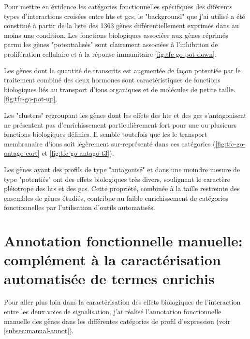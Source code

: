 \documentclass[../main.tex]{subfiles}
\begin{document}


Pour mettre en évidence les catégories fonctionnelles spécifiques des diférents types d'interactions croisées entre \glspl{ht} et \glspl{gc}, le "background" que j'ai utilisé a été constitué à partir de la liste des 1363 gènes différentiellement exprimés dans au moins une condition.
Les fonctions biologiques associées aux gènes réprimés parmi les gènes "potentialisés" sont clairement associées à l'inhibition de prolifération cellulaire et à la réponse immunitaire  \autoref{fig:tfc-go-pot-down}.



Les gènes dont la quantité de transcrits est augmentée de façon potentiée par le traitement combiné des deux hormones sont caractéristiques de fonctions biologiques liés au transport d'ions organiques et de molécules de petite taille. \autoref{fig:tfc-go-pot-up}.



Les "clusters" regroupant les gènes dont les effets des \glspl{ht} et des \glspl{gc} s'antagonisent ne présentent pas d'enrichissement particulièrement fort pour une ou plusieurs fonctions biologiques définies.
Il semble toutefois que les le transport membranaire d'ions soit légèrement sur-représenté dans ces catégories (\autoref{fig:tfc-go-antago-cort} et \autoref{fig:tfc-go-antago-t3}).





Les gènes ayant des profils de type "antagonisé" et dans une moindre mesure de type "potentiés" ont des effets biologiques très divers, soulignant le caractère pléiotrope des \glspl{ht} et des \glspl{gc}.
Cette propriété, combinée à la taille restreinte des ensembles de gènes étudiés, contribue au faible enrichissement de catégories fonctionnelles par l'utilisation d'outils automatisés.


\section{Annotation fonctionnelle manuelle: complément à la caractérisation automatisée de termes enrichis}

Pour aller plus loin dans la caractérisation des effets biologiques de l'interaction entre les deux voies de signalisation, j'ai réalisé l'annotation fonctionnelle manuelle des gènes dans les différentes catégories de profil d'expression (voir \autoref{subsec:manual-annot}).
\end{document}
